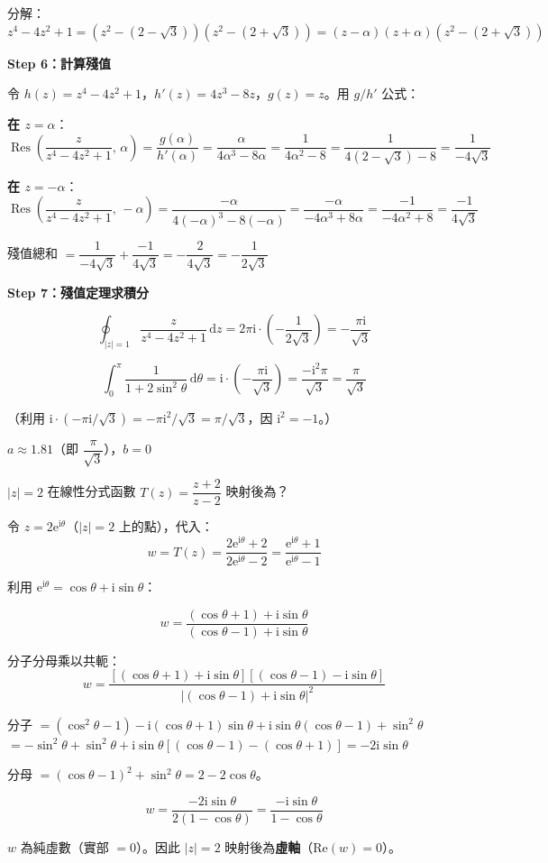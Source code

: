 \documentclass[12pt,a4paper]{article}
\newcommand{\dd}{\,\mathrm{d}}
\newcommand{\ii}{\mathrm{i}}
\newcommand{\ee}{\mathrm{e}}
\newcommand{\Res}{\operatorname{Res}}
\begin{document}
\begin{solbox}[解]
分解：$z^4-4z^2+1=(z^2-(2-\sqrt{3}))(z^2-(2+\sqrt{3}))=(z-\alpha)(z+\alpha)(z^2-(2+\sqrt{3}))$

\textbf{Step 6：計算殘值}

令 $h(z)=z^4-4z^2+1$，$h'(z)=4z^3-8z$，$g(z)=z$。用 $g/h'$ 公式：

\textbf{在 $z=\alpha$}：
$$\Res\!\left(\frac{z}{z^4-4z^2+1},\,\alpha\right)=\frac{g(\alpha)}{h'(\alpha)}=\frac{\alpha}{4\alpha^3-8\alpha}=\frac{1}{4\alpha^2-8}=\frac{1}{4(2-\sqrt{3})-8}=\frac{1}{-4\sqrt{3}}$$

\textbf{在 $z=-\alpha$}：
$$\Res\!\left(\frac{z}{z^4-4z^2+1},\,-\alpha\right)=\frac{-\alpha}{4(-\alpha)^3-8(-\alpha)}=\frac{-\alpha}{-4\alpha^3+8\alpha}=\frac{-1}{-4\alpha^2+8}=\frac{-1}{4\sqrt{3}}$$

殘值總和 $=\dfrac{1}{-4\sqrt{3}}+\dfrac{-1}{4\sqrt{3}}=-\dfrac{2}{4\sqrt{3}}=-\dfrac{1}{2\sqrt{3}}$

\textbf{Step 7：殘值定理求積分}

$$\oint_{|z|=1}\frac{z}{z^4-4z^2+1}\dd{z}=2\pi\ii\cdot\left(-\frac{1}{2\sqrt{3}}\right)=-\frac{\pi\ii}{\sqrt{3}}$$

$$\int_0^{\pi}\frac{1}{1+2\sin^2\theta}\dd{\theta}=\ii\cdot\left(-\frac{\pi\ii}{\sqrt{3}}\right)=\frac{-\ii^2\pi}{\sqrt{3}}=\frac{\pi}{\sqrt{3}}$$

（利用 $\ii\cdot(-\pi\ii/\sqrt{3})=-\pi\ii^2/\sqrt{3}=\pi/\sqrt{3}$，因 $\ii^2=-1$。）
\end{solbox}

\begin{ansbox}
$a\approx\boxed{1.81}$（即 $\dfrac{\pi}{\sqrt{3}}$），$b=\boxed{0}$
\end{ansbox}

\begin{qbox}[第 11 題]
$|z|=2$ 在線性分式函數 $T(z)=\dfrac{z+2}{z-2}$ 映射後為？
\end{qbox}

\begin{solbox}[解]
令 $z=2\ee^{\ii\theta}$（$|z|=2$ 上的點），代入：
$$w=T(z)=\frac{2\ee^{\ii\theta}+2}{2\ee^{\ii\theta}-2}=\frac{\ee^{\ii\theta}+1}{\ee^{\ii\theta}-1}$$

利用 $\ee^{\ii\theta}=\cos\theta+\ii\sin\theta$：

$$w=\frac{(\cos\theta+1)+\ii\sin\theta}{(\cos\theta-1)+\ii\sin\theta}$$

分子分母乘以共軛：
$$w=\frac{[(\cos\theta+1)+\ii\sin\theta][(\cos\theta-1)-\ii\sin\theta]}{|(\cos\theta-1)+\ii\sin\theta|^2}$$

分子 $=(\cos^2\theta-1)-\ii(\cos\theta+1)\sin\theta+\ii\sin\theta(\cos\theta-1)+\sin^2\theta$
$=-\sin^2\theta+\sin^2\theta+\ii\sin\theta[(\cos\theta-1)-(\cos\theta+1)]=-2\ii\sin\theta$

分母 $=(\cos\theta-1)^2+\sin^2\theta=2-2\cos\theta$。

$$w=\frac{-2\ii\sin\theta}{2(1-\cos\theta)}=\frac{-\ii\sin\theta}{1-\cos\theta}$$

$w$ 為純虛數（實部 $=0$）。因此 $|z|=2$ 映射後為\textbf{虛軸}（$\text{Re}(w)=0$）。
\end{solbox}
\end{document}
